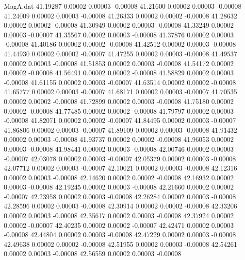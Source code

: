 \begin{filecontents}{MagA.dat}
  41.19287    0.00002    0.00003   -0.00008
  41.21600    0.00002    0.00003   -0.00008
  41.24009    0.00002    0.00003   -0.00008
  41.26333    0.00002    0.00002   -0.00008
  41.28632    0.00002    0.00002   -0.00008
  41.30949    0.00002    0.00003   -0.00008
  41.33249    0.00002    0.00003   -0.00007
  41.35567    0.00002    0.00003   -0.00008
  41.37876    0.00002    0.00003   -0.00008
  41.40186    0.00002    0.00002   -0.00008
  41.42512    0.00002    0.00003   -0.00008
  41.44930    0.00002    0.00002   -0.00007
  41.47255    0.00002    0.00003   -0.00008
  41.49537    0.00002    0.00003   -0.00008
  41.51853    0.00002    0.00003   -0.00008
  41.54172    0.00002    0.00002   -0.00008
  41.56491    0.00002    0.00002   -0.00008
  41.58829    0.00002    0.00003   -0.00008
  41.61155    0.00002    0.00003   -0.00007
  41.63514    0.00002    0.00002   -0.00008
  41.65777    0.00002    0.00003   -0.00007
  41.68171    0.00002    0.00003   -0.00007
  41.70535    0.00002    0.00002   -0.00008
  41.72899    0.00002    0.00003   -0.00008
  41.75180    0.00002    0.00002   -0.00008
  41.77485    0.00002    0.00002   -0.00008
  41.79797    0.00002    0.00003   -0.00008
  41.82071    0.00002    0.00002   -0.00007
  41.84495    0.00002    0.00003   -0.00007
  41.86806    0.00002    0.00003   -0.00007
  41.89109    0.00002    0.00003   -0.00008
  41.91432    0.00002    0.00003   -0.00008
  41.93737    0.00002    0.00002   -0.00008
  41.96053    0.00002    0.00003   -0.00008
  41.98441    0.00002    0.00003   -0.00008
  42.00746    0.00002    0.00003   -0.00007
  42.03078    0.00002    0.00003   -0.00007
  42.05379    0.00002    0.00003   -0.00008
  42.07712    0.00002    0.00003   -0.00007
  42.10021    0.00002    0.00003   -0.00008
  42.12316    0.00002    0.00003   -0.00008
  42.14620    0.00002    0.00002   -0.00008
  42.16932    0.00002    0.00003   -0.00008
  42.19245    0.00002    0.00003   -0.00008
  42.21660    0.00002    0.00002   -0.00007
  42.23958    0.00002    0.00003   -0.00008
  42.26284    0.00002    0.00003   -0.00008
  42.28596    0.00002    0.00003   -0.00008
  42.30914    0.00002    0.00002   -0.00008
  42.33206    0.00002    0.00003   -0.00008
  42.35617    0.00002    0.00003   -0.00008
  42.37924    0.00002    0.00002   -0.00007
  42.40235    0.00002    0.00002   -0.00007
  42.42471    0.00002    0.00003   -0.00008
  42.44804    0.00002    0.00003   -0.00008
  42.47229    0.00002    0.00003   -0.00008
  42.49638    0.00002    0.00002   -0.00008
  42.51955    0.00002    0.00003   -0.00008
  42.54261    0.00002    0.00003   -0.00008
  42.56559    0.00002    0.00003   -0.00008

\end{filecontents}
